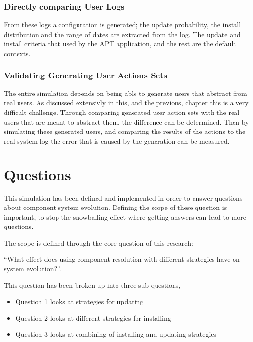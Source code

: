 \subsubsection{Directly comparing User Logs}
From these logs a configuration is generated; the update probability, the install distribution and the range of dates are extracted from the log.
The update and install criteria that used by the APT application, and the rest are the default contexts.  


\subsubsection{Validating Generating User Actions Sets}
The entire simulation depends on being able to generate users that abstract from real users.
As discussed extensivly in this, and the previous, chapter this is a very difficult challenge.
Through comparing generated user action sets with the real users that are meant to abstract them, the difference can be determined.
Then by simulating these generated users, and comparing the results of the actions to the real system log the error that is caused by the generation can be measured.  




\section{Questions}
This simulation has been defined and implemented in order to answer questions about component system evolution.
Defining the scope of these question is important, to stop the snowballing effect where getting answers can lead to more questions. 

The scope is defined through the core question of this research:

``What effect does using component resolution with different strategies have on system evolution?''.

This question has been broken up into three sub-questions,
\begin{itemize}
  \item Question 1 looks at strategies for updating
  \item Question 2 looks at different strategies for installing
  \item Question 3 looks at combining of installing and updating strategies
\end{itemize}

